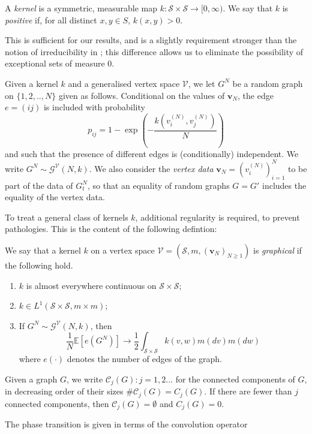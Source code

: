 \begin{definition}
    A \emph{kernel} is a symmetric, measurable map $k: \mathcal{S}\times \mathcal{S} \rightarrow [0, \infty).$ We say that $k$ is \emph{positive} if, for all distinct $x,y \in S$, $k(x,y)>0$. 
    \end{definition} This is sufficient for our results, and is a slightly requirement stronger than the notion of irreducibility in \cite{BJR07}; this difference allows us to eliminate the possibility of exceptional sets of measure $0$. \begin{definition}\label{definition of GN} Given a kernel $k$ and a generalised vertex space $\mathcal{V}$, we let
    $G^N$ be a random graph on $\{1, 2,..,N\}$ given as follows. Conditional on the values of $\mathbf{v}_N$, the edge $e=(ij)$ is included with probability \begin{equation}
        p_{ij}=1-\exp\left(-\frac{k(v^{(N)}_i,v^{(N)}_j)}{N} \right)
    \end{equation} and such that the presence of different edges is (conditionally) independent. We write $G^N\sim\mathcal{G}^\mathcal{V}(N,k)$. We also consider the \emph{vertex data}  $\mathbf{v}_N=(v^{(N)}_i)_{i=1}^N$ to be part of the data of $G^N_t$, so that an equality of random graphs $G=G'$ includes the equality of the vertex data.
\end{definition} To treat a general class of kernels $k$, additional regularity is required, to prevent pathologies. This is the content of the following defintion: \begin{definition}
    We say that a kernel $k$ on a vertex space $\mathcal{V}=(\mathcal{S}, m, (\mathbf{v}_N)_{N\geq 1})$ is \emph{graphical} if the following hold. 
    \begin{enumerate}[label=\roman{*}).]
        \item $k$ is almost everywhere continuous on $\mathcal{S}\times\mathcal{S};$
        \item $k \in L^1(\mathcal{S}\times \mathcal{S}, m \times m)$;
        \item If $G^N \sim \mathcal{G}^\mathcal{V}(N,k)$, then
        \begin{equation}
            \frac{1}{N}\mathbb{E}\left[e\left(G^N\right)\right]\rightarrow \frac{1}{2}\int_{\mathcal{S}\times \mathcal{S}} k(v,w)m(dv)m(dw)
        \end{equation} where $e(\cdot)$ denotes the number of edges of the graph.
    \end{enumerate}
\end{definition}  \begin{definition}
 Given a graph $G$, we write $\mathcal{C}_j(G): j=1, 2...$ for the connected components of $G$, in decreasing order of their sizes $\#\mathcal{C}_j(G)=C_j(G)$. If there are fewer than $j$ connected components, then $\mathcal{C}_j(G)=\emptyset$ and $C_j(G)=0$.
\end{definition}The phase transition is given in terms of the convolution operator
